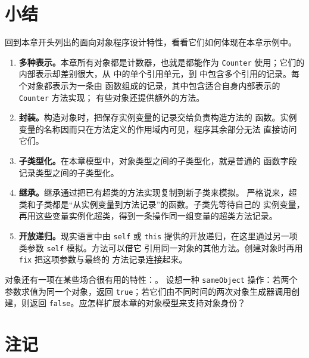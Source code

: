 \section{小结}
\label{sec:18.13}

回到本章开头列出的面向对象程序设计特性，看看它们如何体现在本章示例中。

\begin{enumerate}
\item \textbf{多种表示。}本章所有对象都是计数器，也就是都能作为
  \texttt{Counter} 使用；它们的内部表示却差别很大，从
  中的单个引用单元，到
  中包含多个引用的记录。每个对象都表示为一条由
  函数组成的记录，其中包含适合自身内部表示的 \texttt{Counter} 方法实现；
  有些对象还提供额外的方法。

\item \textbf{封装。}构造对象时，把保存实例变量的记录交给负责构造方法的
  函数。实例变量的名称因而只在方法定义的作用域内可见，程序其余部分无法
  直接访问它们。

\item \textbf{子类型化。}在本章模型中，对象类型之间的子类型化，就是普通的
  函数字段记录类型之间的子类型化。

\item \textbf{继承。}继承通过把已有超类的方法实现复制到新子类来模拟。
  严格说来，超类和子类都是“从实例变量到方法记录”的函数。子类先等待自己的
  实例变量，再用这些变量实例化超类，得到一条操作同一组变量的超类方法记录。

\item \textbf{开放递归。}现实语言中由 \texttt{self} 或 \texttt{this}
  提供的开放递归，在这里通过另一项类参数 \texttt{self} 模拟。方法可以借它
  引用同一对象的其他方法。创建对象时再用 \texttt{fix} 把这项参数与最终的
  方法记录连接起来。
\end{enumerate}

\begin{exercise}[\(\star\star\star\)]
\label{ex:18.13.1}
对象还有一项在某些场合很有用的特性：。
设想一种 \texttt{sameObject} 操作：若两个参数求值为同一个对象，返回
\texttt{true}；若它们由不同时间的两次对象生成器调用创建，则返回
\texttt{false}。应怎样扩展本章的对象模型来支持对象身份？
\end{exercise}

\section{注记}
\label{sec:18.14}

